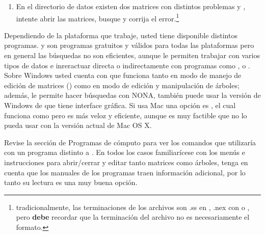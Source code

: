 \begin{enumerate}
	\item En el directorio de datos existen dos matrices con distintos problemas  y , intente abrir las matrices, busque  y corrija el error.\footnote{tradicionalmente, las terminaciones de los archivos son .ss en , .nex con  o , pero \textbf{debe} recordar que la terminaci\'on del archivo no es necesariamente el formato.}

\end{enumerate} 


Dependiendo de la plataforma que trabaje, usted tiene disponible distintos programas.  y   son programas gratuitos y v\'alidos para todas las plataformas pero en general las b\'usquedas no son eficientes, aunque le permiten trabajar con varios tipos de datos e inreractuar directa o indirectamente con programas como , o . Sobre Windows usted cuenta con  que funciona tanto en modo de manejo de edici\'on de matrices () como en modo de edici\'on y manipulaci\'on de \'arboles; adem\'as, le permite hacer b\'usquedas con NONA, tambi\'en puede usar la versi\'on de Windows de  que tiene interface gr\'afica. Si usa Mac una opci\'on es , el cual funciona como  pero es m\'as veloz y eficiente, aunque es muy factible que no lo pueda usar con la versi\'on actual de Mac OS X.


Revise la secci\'on de Programas de c\'omputo para ver los comandos que utilizar\'ia con un programa distinto a . En todos los casos familiar\'icese con los men\'us e instrucciones para abrir/cerrar y editar tanto matrices como \'arboles, tenga en cuenta que los manuales de los programas traen informaci\'on adicional, por lo tanto su lectura es una muy buena opci\'on.

